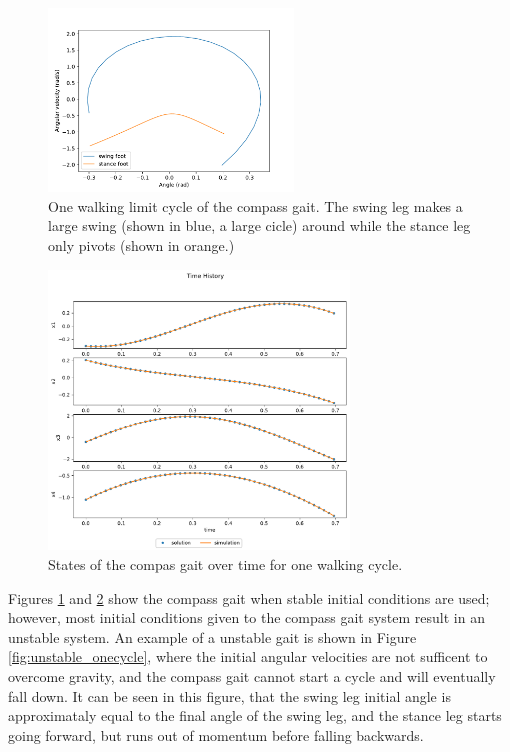 \documentclass{./springer/svjour3}
\begin{document}
\begin{figure}[!h]
\centering
\includegraphics[width=6.5cm]{./figures/onecycle.pdf}
\caption{One walking limit cycle of the compass gait. The swing leg makes a large swing (shown in blue, a large cicle) around while the stance leg only pivots (shown in orange.)}
\label{fig:onecycle}
\end{figure}

\begin{figure}[h]
\centering
\includegraphics[width=8cm]{./figures/states_onecycle.pdf}
\caption{States of the compas gait over time for one walking cycle.}
\label{fig:states_onecycle}
\end{figure}

Figures \ref{fig:onecycle} and \ref{fig:states_onecycle} show the compass gait when stable initial conditions are used; however, most initial conditions
given to the compass gait system result in an unstable system. An example of a unstable gait is shown in Figure \ref{fig:unstable_onecycle}, where the initial angular velocities are 
not sufficent to overcome gravity, and the compass gait cannot start a cycle and will eventually fall down. It can be seen in this figure, that the swing leg initial angle 
is approximataly equal to the final angle of the swing leg, and the stance leg starts going forward, but runs out of momentum before falling backwards.
\end{document}
